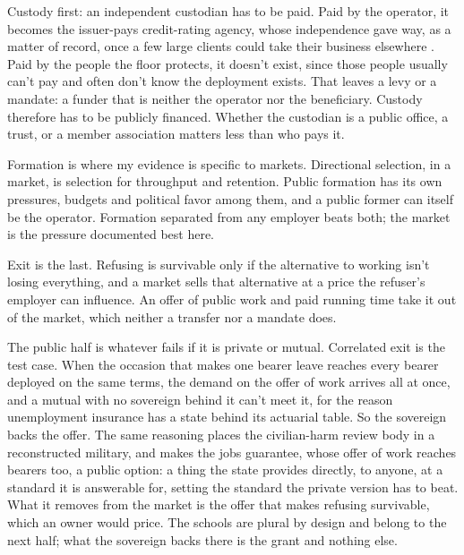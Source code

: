 Custody first: an independent custodian has to be paid. Paid by the operator, it becomes the issuer-pays credit-rating agency, whose independence gave way, as a matter of record, once a few large clients could take their business elsewhere \autocite{white2010rating}. Paid by the people the floor protects, it doesn't exist, since those people usually can't pay and often don't know the deployment exists. That leaves a levy or a mandate: a funder that is neither the operator nor the beneficiary. Custody therefore has to be publicly financed. Whether the custodian is a public office, a trust, or a member association matters less than who pays it.

Formation is where my evidence is specific to markets. Directional selection, in a market, is selection for throughput and retention.
Public formation has its own pressures, budgets and political favor among them, and a public former can itself be the operator. Formation separated from any employer beats both; the market is the pressure documented best here.

Exit is the last. Refusing is survivable only if the alternative to working isn't losing everything, and a market sells that alternative at a price the refuser's employer can influence. An offer of public work and paid running time take it out of the market, which neither a transfer nor a mandate does.

The public half is whatever fails if it is private or mutual. Correlated exit is the test case. When the occasion that makes one bearer leave reaches every bearer deployed on the same terms, the demand on the offer of work arrives all at once, and a mutual with no sovereign behind it can't meet it, for the reason unemployment insurance has a state behind its actuarial table. So the sovereign backs the offer. The same reasoning places the civilian-harm review body in a reconstructed military, and makes the jobs guarantee, whose offer of work reaches bearers too, a public option: a thing the state provides directly, to anyone, at a standard it is answerable for, setting the standard the private version has to beat. What it removes from the market is the offer that makes refusing survivable, which an owner would price. The schools are plural by design and belong to the next half; what the sovereign backs there is the grant and nothing else.

